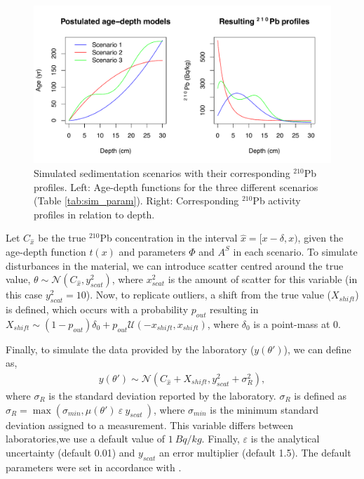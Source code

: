 \documentclass [10pt] {article}
\begin{document}
\begin{figure}[!h]
 \centering
  \includegraphics[width=.95\linewidth]{chronology.pdf}
	\caption{Simulated sedimentation scenarios with their corresponding $^{210}$Pb profiles. Left: Age-depth functions for the three different scenarios (Table \ref{tab:sim_param}). Right: Corresponding $^{210}$Pb activity profiles in relation to depth.}
  \label{fig:true_210}
\end{figure}


	Let $C_{\hat{x}}$ be the true $^{210}$Pb concentration in the interval $\hat{x}=[ x-\delta, x)$, given the age-depth function $t(x)$ and parameters $\Phi$ and $A^S$ in each scenario. 
To simulate disturbances in the material, we can introduce scatter centred around the true value, $\theta \sim \mathcal{N}\left(C_{\hat{x}},y^2_{scat}\right)$, where $x^2_{scat}$ is the amount of scatter for this variable (in this case $y^2_{scat}=10$). 
Now, to replicate outliers, a shift from the true value ($X_{shift}$) is defined, which occurs with a probability $p_{out}$ resulting in 
$X_{shift} \sim (1-p_{out}) \delta_0 + p_{out} \mathcal{U}(-x_{shift}, x_{shift})$, where $\delta_0$ is a point-mass at 0.

Finally, to simulate the data provided by the laboratory ($y(\theta')$), we can define as,  
\begin{align}
	y(\theta')\sim\mathcal{N}\left(C_{\hat{x}} + X_{shift}, y^2_{scat} + \sigma^2_{R} \right), 
\end{align}
where $\sigma_R$ is the standard deviation reported by the laboratory. 
$\sigma_R$ is defined as $\sigma_R= \max \left(\sigma_{min}, \mu(\theta')~\varepsilon~y_{scat}~\right)$, where $\sigma_{min}$ is the minimum standard deviation assigned to a measurement. This variable differs between laboratories,we use a default value of $1~ Bq/kg$. 
Finally, $\varepsilon$ is the analytical uncertainty (default 0.01) and $y_{scat}$ an error multiplier (default 1.5).
The default parameters were set in accordance with \citet{Blaauw2018}.
\end{document}
